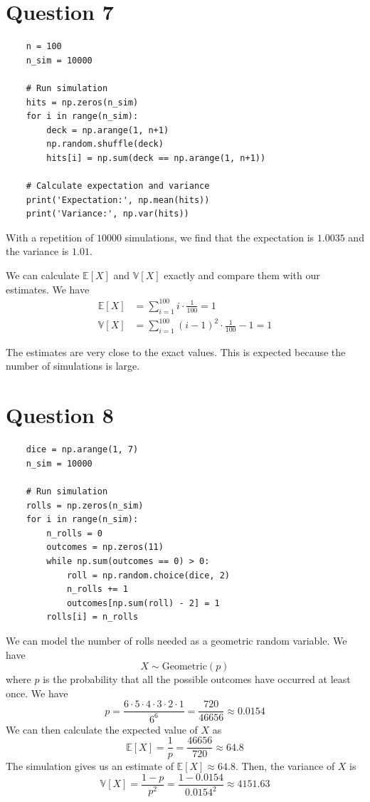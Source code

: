 \documentclass{article}
\begin{document}
\section*{Question 7}
\begin{verbatim}
    n = 100
    n_sim = 10000
     
    # Run simulation
    hits = np.zeros(n_sim)
    for i in range(n_sim):
        deck = np.arange(1, n+1)
        np.random.shuffle(deck)
        hits[i] = np.sum(deck == np.arange(1, n+1))
        
    # Calculate expectation and variance
    print('Expectation:', np.mean(hits))
    print('Variance:', np.var(hits))
\end{verbatim}

With a repetition of $10000$ simulations, we find that the expectation is $1.0035$ and the variance is $1.01$.


We can calculate $\mathbb{E}[X]$ and $\mathbb{V}[X]$ exactly and compare them with our estimates. We have
\begin{align*}
    \mathbb{E}[X] &= \sum_{i=1}^{100} i \cdot \frac{1}{100} = 1 \\
    \mathbb{V}[X] &= \sum_{i=1}^{100} (i - 1)^2 \cdot \frac{1}{100} - 1 = 1
\end{align*}

The estimates are very close to the exact values. This is expected because the number of simulations is large.

\section*{Question 8}
\begin{verbatim}
    dice = np.arange(1, 7)
    n_sim = 10000
    
    # Run simulation
    rolls = np.zeros(n_sim)
    for i in range(n_sim):
        n_rolls = 0
        outcomes = np.zeros(11)
        while np.sum(outcomes == 0) > 0:
            roll = np.random.choice(dice, 2)
            n_rolls += 1
            outcomes[np.sum(roll) - 2] = 1
        rolls[i] = n_rolls
\end{verbatim}

We can model the number of rolls needed as a geometric random variable. We have
\[
    X \sim \text{Geometric}(p)
\]
where $p$ is the probability that all the possible outcomes have occurred at least once. We have
\[
    p = \frac{6 \cdot 5 \cdot 4 \cdot 3 \cdot 2 \cdot 1}{6^6} = \frac{720}{46656} \approx 0.0154
\]
We can then calculate the expected value of $X$ as
\[
    \mathbb{E}[X] = \frac{1}{p} = \frac{46656}{720} \approx 64.8
\]
The simulation gives us an estimate of $\mathbb{E}[X] \approx 64.8$. Then, the variance of $X$ is
\[
    \mathbb{V}[X] = \frac{1 - p}{p^2} = \frac{1 - 0.0154}{0.0154^2} \approx 4151.63
\]
\end{document}
